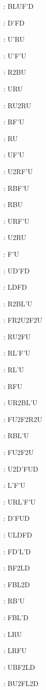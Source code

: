 \documentclass[9pt]{article}
\begin{document}
{\begin{multicols}{6}
: BLUF'D

: D'FD

: U'RU

: U'F'U

: R2BU

: URU

: RU2RU

: RF'U

: RU

: UF'U

: U2RF'U

: RBF'U

: RBU

: URF'U

: U2RU

: F'U

: UD'FD

: LDFD

: R2BL'U

: FR2U2F2U

: RU2FU

: RL'F'U

: RL'U

: RFU

: UR2BL'U

: FU2F2R2U

: RBL'U

: FU2F2U

: U2D'FUD

: L'F'U

: URL'F'U

: D'FUD

: ULDFD

: FD'L'D

: BF2LD

: FBL2D

: RB'U

: FBL'D

: LRU

: LRFU

: UBF2LD

: BU2FL2D


\end{multicols}}
\end{document}
